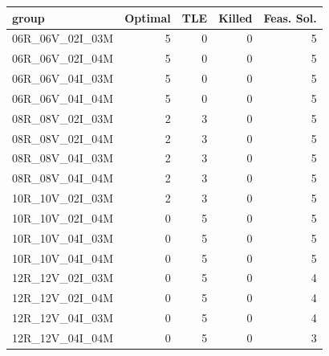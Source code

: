 
\begin{tabular}{lrrrr}
\toprule
group & Optimal & TLE & Killed & Feas. Sol.\\
\midrule
06R\_06V\_02I\_03M & 5 & 0 & 0 & 5\\
06R\_06V\_02I\_04M & 5 & 0 & 0 & 5\\
06R\_06V\_04I\_03M & 5 & 0 & 0 & 5\\
06R\_06V\_04I\_04M & 5 & 0 & 0 & 5\\
08R\_08V\_02I\_03M & 2 & 3 & 0 & 5\\
\addlinespace
08R\_08V\_02I\_04M & 2 & 3 & 0 & 5\\
08R\_08V\_04I\_03M & 2 & 3 & 0 & 5\\
08R\_08V\_04I\_04M & 2 & 3 & 0 & 5\\
10R\_10V\_02I\_03M & 2 & 3 & 0 & 5\\
10R\_10V\_02I\_04M & 0 & 5 & 0 & 5\\
\addlinespace
10R\_10V\_04I\_03M & 0 & 5 & 0 & 5\\
10R\_10V\_04I\_04M & 0 & 5 & 0 & 5\\
12R\_12V\_02I\_03M & 0 & 5 & 0 & 4\\
12R\_12V\_02I\_04M & 0 & 5 & 0 & 4\\
12R\_12V\_04I\_03M & 0 & 5 & 0 & 4\\
\addlinespace
12R\_12V\_04I\_04M & 0 & 5 & 0 & 3\\
\bottomrule
\end{tabular}
